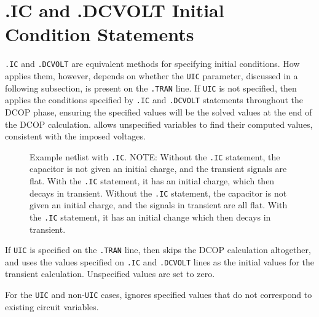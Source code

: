 \newpage
\section{.IC and .DCVOLT Initial Condition Statements}
\label{IC_statement_spec}


\texttt{.IC} and \texttt{.DCVOLT} are equivalent methods for
specifying initial conditions.  How \Xyce{} applies them, however,
depends on whether the \texttt{UIC} parameter, discussed in a following
subsection, is present on the \texttt{.TRAN} line.  
If \texttt{UIC} is not specified, then \Xyce{}
applies the conditions specified by \texttt{.IC} and
\texttt{.DCVOLT} statements throughout the DCOP phase, ensuring the
specified values will be the solved values at the end of the DCOP
calculation.  \Xyce{} allows unspecified variables to find their
computed values, consistent with the imposed voltages.

\begin{figure}[htbp]
\begin{centering}
\caption[Example netlist with \texttt{.IC}.]{Example netlist with \texttt{.IC}. 
NOTE:	Without the \texttt{.IC} statement, the capacitor is not given an initial charge, and the transient signals are flat. With the \texttt{.IC} statement, it has an initial charge, which then decays in transient. Without the \texttt{.IC} statement, the capacitor is not given an initial charge, and the signals in transient are all flat.  With the \texttt{.IC} statement, it has an initial change which then decays in transient.  \label{IC_Netlist_2}}
\end{centering}
\end{figure}

If \texttt{UIC} is specified on the \texttt{.TRAN} line, then \Xyce{}
skips the DCOP calculation altogether, and uses the values specified
on \texttt{.IC} and \texttt{.DCVOLT} lines as the initial values for
the transient calculation.  Unspecified values are set to zero.

For the \texttt{UIC} and non-\texttt{UIC} cases, \Xyce{} ignores
specified values that do not correspond to existing circuit variables.

